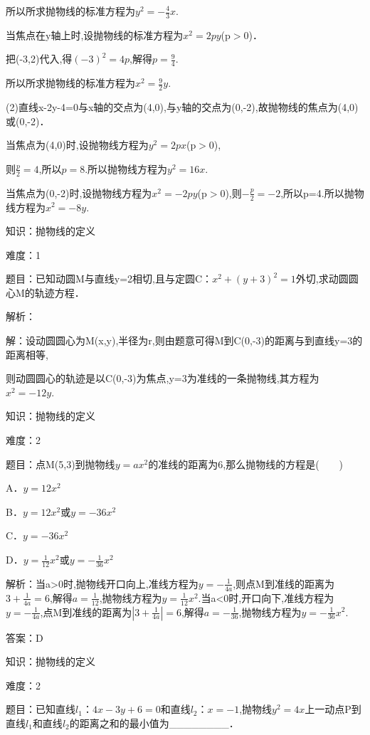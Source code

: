 \documentclass{article} %
\begin{document}
所以所求抛物线的标准方程为$y^{2}=-\frac{4}{3}x$.

当焦点在y轴上时,设抛物线的标准方程为$x^{2}=2py$(p${>}$0)．

把(-3,2)代入,得$(-3)^{2}=4p$,解得$p=\frac{9}{4}$.

所以所求抛物线的标准方程为$x^{2}=\frac{9}{2}y$.

(2)直线x-2y-4=0与x轴的交点为(4,0),与y轴的交点为(0,-2),故抛物线的焦点为(4,0)或(0,-2)．

当焦点为(4,0)时,设抛物线方程为$y^{2}=2px$(p${>}$0),

则$\frac{p}{2}=4$,所以$p=8$.所以抛物线方程为$y^{2}=16x$.

当焦点为(0,-2)时,设抛物线方程为$x^{2}=-2py$(p${>}$0),则$-\frac{p}{2}=-2$,所以p=4.所以抛物线方程为$x^{2}=-8y$.



知识：抛物线的定义

难度：1

题目：已知动圆M与直线y=2相切,且与定圆C：$x^{2}+(y+3)^{2}=1$外切,求动圆圆心M的轨迹方程．

解析：

解：设动圆圆心为M(x,y),半径为r,则由题意可得M到C(0,-3)的距离与到直线y=3的距离相等,

则动圆圆心的轨迹是以C(0,-3)为焦点,y=3为准线的一条抛物线,其方程为$x^{2}=-12y$.



知识：抛物线的定义

难度：2

题目：点M(5,3)到抛物线$y=ax^{2}$的准线的距离为6,那么抛物线的方程是(　　)

A．$y=12x^{2}$

B．$y=12x^{2}$或$y=-36x^{2}$

C．$y=-36x^{2}$

D．$y=\frac{1}{12}x^{2}$或$y=-\frac{1}{36}x^{2}$

解析：当a>0时,抛物线开口向上,准线方程为$y=-\frac{1}{4a}$,则点M到准线的距离为$3+\frac{1}{4a}=6$,解得$a=\frac{1}{12}$,抛物线方程为$y=\frac{1}{12}x^{2}$.当a<0时,开口向下,准线方程为$y=-\frac{1}{4a}$,点M到准线的距离为$|3+\frac{1}{4a}|=6$,解得$a=-\frac{1}{36}$,抛物线方程为$y=-\frac{1}{36}x^{2}$.

答案：D

知识：抛物线的定义

难度：2

题目：已知直线$l_{1}：4x-3y+6=0$和直线$l_{2}：x=-1$,抛物线$y^{2}=4x$上一动点P到直线$l_{1}$和直线$l_{2}$的距离之和的最小值为\_\_\_\_\_\_\_\_．
\end{document}
